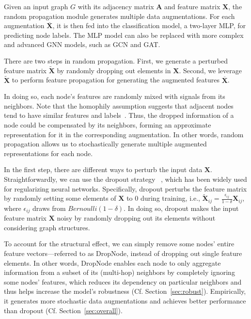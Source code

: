 Given an input graph $G$ with its adjacency matrix $\mathbf{A}$ and feature matrix $\mathbf{X}$, the random propagation module generates multiple data augmentations. 
For each augmentation $\overline{\mathbf{X}}$, it is then fed into the classification model, a two-layer MLP, for predicting node labels. 
The MLP model can also be replaced with more complex and advanced GNN models, such as GCN and GAT.







There are two steps in random propagation. 
First, we generate a perturbed feature matrix $\widetilde{\mathbf{X}}$ by randomly dropping out elements in $\mathbf{X}$.  Second, we leverage $\widetilde{\mathbf{X}}$ to perform feature propagation for generating the augmented features $\overline{\mathbf{X}}$. 

In doing so, each node's features are randomly mixed with signals from its neighbors. Note that the homophily assumption suggests that adjacent nodes tend to have similar features and labels~\cite{mcpherson2001birds}. 
Thus, the dropped information of a node could be compensated by its neighbors, forming an approximate representation for it in the corresponding augmentation. In other words, random propagation allows us to stochastically generate multiple augmented representations for each node. 










In the first step, there are different ways to perturb the input data $\mathbf{X}$. 
Straightforwardly, we can use the dropout strategy ~\cite{srivastava2014dropout}, which has been widely used for regularizing neural networks. 
Specifically, dropout perturbs the feature matrix by randomly setting some elements of $\mathbf{X}$ to 0 during training, i.e., $\widetilde{\mathbf{X}}_{ij} = \frac{\epsilon_{ij}}{1-\delta} \mathbf{X}_{ij}$, where $\epsilon_{ij}$ draws from $Bernoulli(1-\delta)$. 
In doing so, dropout makes the input feature matrix $\mathbf{X}$ noisy by randomly dropping out its elements without considering graph structures.



To account for the structural effect, we can simply remove some nodes' entire feature vectors---referred to as DropNode, instead of dropping out single feature elements. 
In other words, DropNode enables each node to only aggregate information from a subset of its (multi-hop) neighbors by completely ignoring some nodes' features, which reduces its dependency on particular neighbors and thus helps increase the model's robustness (Cf. Section~\ref{sec:robust}). 
Empirically, it generates more stochastic data augmentations and achieves better performance than dropout (Cf. Section~\ref{sec:overall}). 


